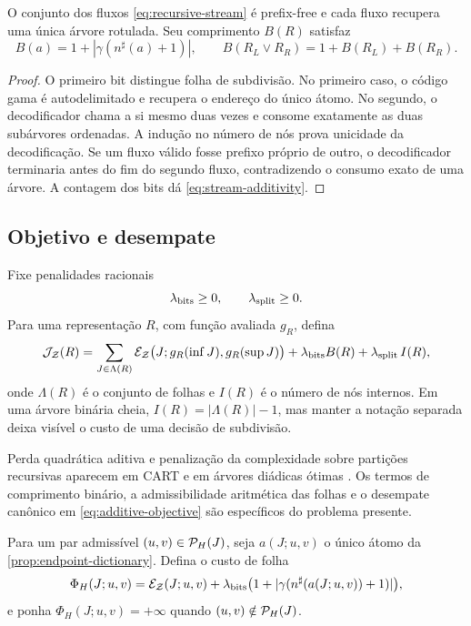 \begin{lemma}
\label{lem:recursive-stream}
O conjunto dos fluxos \eqref{eq:recursive-stream} é prefix-free e cada fluxo
recupera uma única árvore rotulada. Seu comprimento $B(R)$ satisfaz
\begin{equation}
 B(a)=1+|\gamma(n^\sharp(a)+1)|,\qquad
 B(R_L\vee R_R)=1+B(R_L)+B(R_R).
 \label{eq:stream-additivity}
\end{equation}
\end{lemma}

\begin{proof}
O primeiro bit distingue folha de subdivisão. No primeiro caso, o código gama
é autodelimitado e recupera o endereço do único átomo. No segundo, o
decodificador chama a si mesmo duas vezes e consome exatamente as duas
subárvores ordenadas. A indução no número de nós prova unicidade da
decodificação. Se um fluxo válido fosse prefixo próprio de outro, o
decodificador terminaria antes do fim do segundo fluxo, contradizendo o
consumo exato de uma árvore. A contagem dos bits dá
\eqref{eq:stream-additivity}.
\end{proof}

\subsection{Objetivo e desempate}

Fixe penalidades racionais
\[
 \lambda_{\rm bits}\ge0,\qquad \lambda_{\rm split}\ge0.
\]
Para uma representação $R$, com função avaliada $g_R$, defina
\begin{equation}
 \mathcal{J}_{\mathcal Z}(R)
 =\sum_{J\in\Lambda(R)}
   \mathcal{E}_{\mathcal Z}\bigl(J;g_R(\inf J),g_R(\sup J)\bigr)
 +\lambda_{\rm bits}B(R)
 +\lambda_{\rm split}\,I(R),
 \label{eq:additive-objective}
\end{equation}
onde $\Lambda(R)$ é o conjunto de folhas e $I(R)$ é o número de nós internos.
Em uma árvore binária cheia, $I(R)=|\Lambda(R)|-1$, mas manter a notação
separada deixa visível o custo de uma decisão de subdivisão.

Perda quadrática aditiva e penalização da complexidade sobre partições
recursivas aparecem em CART e em árvores diádicas ótimas
\citep{breiman1984,donoho1997,blanchard2007}. Os termos de comprimento binário,
a admissibilidade aritmética das folhas e o desempate canônico em
\eqref{eq:additive-objective} são específicos do problema presente.

Para um par admissível $(u,v)\in\mathcal{P}_H(J)$, seja $a(J;u,v)$ o único átomo
da \cref{prop:endpoint-dictionary}. Defina o custo de folha
\begin{equation}
 \Phi_H(J;u,v)=
 \mathcal{E}_{\mathcal Z}(J;u,v)
 +\lambda_{\rm bits}
  \bigl(1+|\gamma(n^\sharp(a(J;u,v))+1)|\bigr),
 \label{eq:leaf-cost}
\end{equation}
e ponha $\Phi_H(J;u,v)=+\infty$ quando $(u,v)\notin\mathcal{P}_H(J)$.


